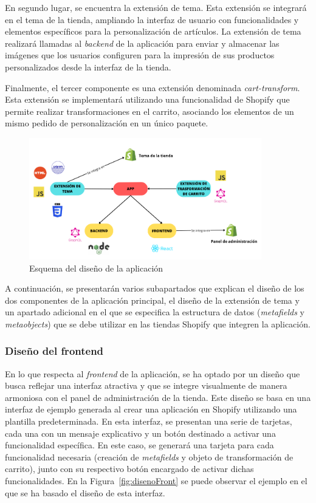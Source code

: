 \documentclass[11pt]{article}
\begin{document}
En segundo lugar, se encuentra la extensión de tema. Esta extensión se integrará en el tema de la tienda, 
ampliando la interfaz de usuario con funcionalidades y elementos específicos para la personalización de artículos. 
La extensión de tema realizará llamadas al \textit{backend} de la aplicación para enviar y almacenar las imágenes que los usuarios 
configuren para la impresión de sus productos personalizados desde la interfaz de la tienda.

Finalmente, el tercer componente es una extensión denominada \textit{cart-transform}. Esta extensión se implementará utilizando 
una funcionalidad de Shopify que permite realizar transformaciones en el carrito, asociando los elementos de un mismo 
pedido de personalización en un único paquete.

\begin{figure}[H]
    \centering
    \includegraphics[width=0.9\textwidth]{imagenes-diseño/Esquema de diseño de la aplicación.png}
    \caption{\label{fig:esquemaAplicacion}Esquema del diseño de la aplicación}
    \vspace{\fill}
\end{figure}

A continuación, se presentarán varios subapartados que explican el diseño de los dos componentes
de la aplicación principal, el diseño de la extensión de tema y un apartado adicional en el que 
se especifica la estructura de datos (\textit{metafields} y \textit{metaobjects}) que se debe utilizar
en las tiendas Shopify que integren la aplicación. 

\subsubsection{Diseño del frontend}

En lo que respecta al \textit{frontend} de la aplicación, se ha optado por un diseño que busca reflejar una interfaz atractiva
y que se integre visualmente de manera armoniosa con el panel de administración de la tienda. 
Este diseño se basa en una interfaz de ejemplo generada al crear una aplicación en Shopify utilizando 
una plantilla predeterminada. En esta interfaz, se presentan una serie de tarjetas, cada una con un mensaje 
explicativo y un botón destinado a activar una funcionalidad específica. En este caso, se generará una tarjeta 
para cada funcionalidad necesaria (creación de \textit{metafields} y objeto de transformación de carrito), junto con su respectivo botón encargado de 
activar dichas funcionalidades. En la Figura~\ref{fig:disenoFront} se puede observar el ejemplo en el que se ha basado el diseño de esta interfaz.
\end{document}
